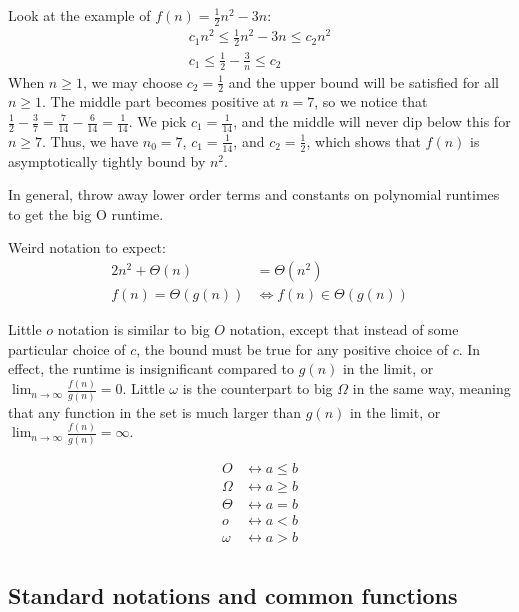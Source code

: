 \documentclass[12pt]{article}
\begin{document}
Look at the example of $f(n) = \frac{1}{2} n^2 - 3n$:
\begin{align*}
    c_1 n^2 \leq \frac{1}{2} n^2 - 3n \leq c_2 n^2 \\
    c_1 \leq \frac{1}{2} - \frac{3}{n} \leq c_2
\end{align*}
When $n \geq 1$, we may choose $c_2 = \frac{1}{2}$ and the upper bound will be satisfied for all $n \geq 1$. The middle part becomes positive at $n = 7$, so we notice that $\frac{1}{2} - \frac{3}{7} = \frac{7}{14} - \frac{6}{14} = \frac{1}{14}$. We pick $c_1 = \frac{1}{14}$, and the middle will never dip below this for $n \geq 7$. Thus, we have $n_0 = 7$, $c_1 = \frac{1}{14}$, and $c_2 = \frac{1}{2}$, which shows that $f(n)$ is asymptotically tightly bound by $n^2$.

In general, throw away lower order terms and constants on polynomial runtimes to get the big O runtime.

Weird notation to expect:
\begin{align*}
    2n^2 + \Theta(n) &= \Theta(n^2) \\
    f(n) = \Theta(g(n)) &\Leftrightarrow f(n) \in \Theta(g(n))
\end{align*}

Little $o$ notation is similar to big $O$ notation, except that instead of some particular choice of $c$, the bound must be true for any positive choice of $c$. In effect, the runtime is insignificant compared to $g(n)$ in the limit, or $\lim_{n \rightarrow \infty}\frac{f(n)}{g(n)} = 0$. Little $\omega$ is the counterpart to big $\Omega$ in the same way, meaning that any function in the set is much larger than $g(n)$ in the limit, or $\lim_{n \rightarrow \infty}\frac{f(n)}{g(n)} = \infty$.

\begin{align*}
    O      &\leftrightarrow a \leq b \\
    \Omega &\leftrightarrow a \geq b \\
    \Theta &\leftrightarrow a =    b \\
    o      &\leftrightarrow a <    b \\
    \omega &\leftrightarrow a >    b \\
\end{align*}

\subsection{Standard notations and common functions}
\end{document}

